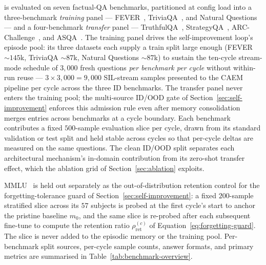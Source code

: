 \caem{} is evaluated on seven factual-QA benchmarks, partitioned at config load into a three-benchmark \emph{training} panel --- FEVER~\cite{thorne-etal-2018-fever}, TriviaQA~\cite{joshi-etal-2017-triviaqa}, and Natural Questions~\cite{kwiatkowski-etal-2019-natural} --- and a four-benchmark \emph{transfer} panel --- TruthfulQA~\cite{lin-etal-2022-truthfulqa}, StrategyQA~\cite{10.1162/tacl_a_00370}, ARC-Challenge~\cite{clark2018think}, and ASQA~\cite{stelmakh2022asqa}.
The training panel drives the self-improvement loop's episode pool: its three datasets each supply a train split large enough (FEVER $\sim\!145$k, TriviaQA $\sim\!87$k, Natural Questions $\sim\!87$k) to sustain the ten-cycle stream-mode schedule of $3{,}000$ fresh questions \emph{per benchmark per cycle} without within-run reuse --- $3 \times 3{,}000 = 9{,}000$ SIL-stream samples presented to the CAEM pipeline per cycle across the three ID benchmarks. The transfer panel never enters the training pool; the multi-source ID/OOD gate of Section~\ref{sec:self-improvement} enforces this admission rule even after memory consolidation merges entries across benchmarks at a cycle boundary. Each benchmark contributes a fixed $500$-sample evaluation slice per cycle, drawn from its standard validation or test split and held stable across cycles so that per-cycle deltas are measured on the same questions. The clean ID/OOD split separates each architectural mechanism's in-domain contribution from its zero-shot transfer effect, which the ablation grid of Section~\ref{sec:ablation} exploits.

MMLU~\cite{hendrycks2021measuring} is held out separately as the out-of-distribution retention control for the forgetting-tolerance guard of Section~\ref{sec:self-improvement}: a fixed $200$-sample stratified slice across its $57$ subjects is probed at the first cycle's start to anchor the pristine baseline $m_{0}$, and the same slice is re-probed after each subsequent fine-tune to compute the retention ratio $\rho_{\text{ret}}^{(c)}$ of Equation~\ref{eq:forgetting-guard}. The slice is never added to the episodic memory or the training pool. Per-benchmark split sources, per-cycle sample counts, answer formats, and primary metrics are summarised in Table~\ref{tab:benchmark-overview}.

